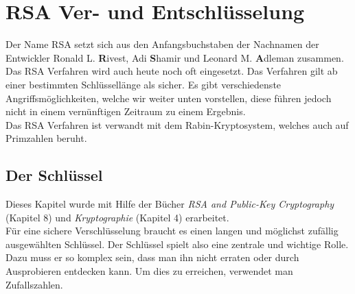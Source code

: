 \newpage
\section{RSA Ver- und Entschlüsselung}
Der Name RSA setzt sich aus den Anfangsbuchstaben der Nachnamen der Entwickler Ronald L. \textbf{R}ivest, Adi \textbf{S}hamir und Leonard M. \textbf{A}dleman zusammen. Das RSA Verfahren wird auch heute noch oft eingesetzt. Das Verfahren gilt ab einer bestimmten Schlüssellänge als sicher. Es gibt verschiedenste Angriffsmöglichkeiten, welche wir weiter unten vorstellen, diese führen jedoch nicht in einem vernünftigen Zeitraum zu einem Ergebnis. \\
Das RSA Verfahren ist verwandt mit dem Rabin-Kryptosystem, welches auch auf Primzahlen beruht. %

\subsection{Der Schlüssel}
Dieses Kapitel wurde mit Hilfe der Bücher \textit{RSA and Public-Key Cryptography}\cite{rsa_and_public_key} (Kapitel 8) und \textit{Kryptographie}\cite{kryptographie} (Kapitel 4) erarbeitet.\\[2ex]
%
Für eine sichere Verschlüsselung braucht es einen langen und möglichst zufällig ausgewählten Schlüssel. Der Schlüssel spielt also eine zentrale und wichtige Rolle. Dazu muss er so komplex sein, dass man ihn nicht erraten oder durch Ausprobieren entdecken kann. Um dies zu erreichen, verwendet man Zufallszahlen.
%
